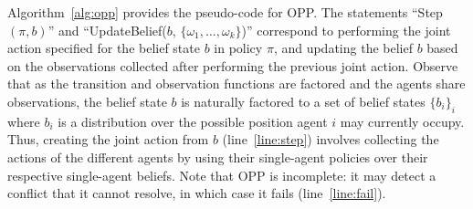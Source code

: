 \documentclass[letterpaper]{article} %
\begin{document}
Algorithm~\ref{alg:opp} provides the pseudo-code for OPP.
The statements ``Step$(\pi,b)$'' and ``UpdateBelief($b$, $\{\omega_1,\ldots,\omega_k\}$)'' correspond to
performing the joint action specified for the belief state $b$ in policy $\pi$,
and updating the belief $b$ based on the observations collected after performing the previous joint action.
Observe that as the transition and observation functions are factored and the agents share observations,
the belief state $b$ is naturally factored to a set of belief states $\{b_i\}_i$ where $b_i$ is a distribution over the possible position agent $i$ may currently occupy. Thus, creating the joint action from $b$ (line~\ref{line:step}) involves collecting the actions of the different agents by using their single-agent policies over their respective single-agent beliefs. Note that OPP is incomplete: it may detect a conflict that it cannot resolve, in which case it fails (line~\ref{line:fail}).
\end{document}
